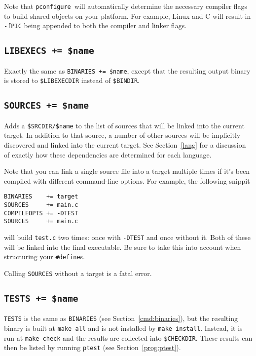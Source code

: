 \documentclass{article}
\newcommand{\pconfigure}{\texttt{pconfigure}}
\begin{document}
Note that \pconfigure\ will automatically determine the necessary
compiler flags to build shared objects on your platform.  For example,
Linux and C will result in \texttt{-fPIC} being appended to both the
compiler and linker flags.

\subsection{\texttt{LIBEXECS += \$name} \label{cmd:libexecs}}

Exactly the same as \texttt{BINARIES += \$name}, except that the
resulting output binary is stored to \texttt{\$LIBEXECDIR} instead of
\texttt{\$BINDIR}.

\subsection{\texttt{SOURCES += \$name} \label{cmd:sources}}

Adds a \texttt{\$SRCDIR/\$name} to the list of sources that will be
linked into the current target.  In addition to that source, a number
of other sources will be implicitly discovered and linked into the
current target.  See Section~\ref{lang} for a discussion of exactly
how these dependencies are determined for each language.

Note that you can link a single source file into a target multiple
times if it's been compiled with different command-line options.  For
example, the following snippit
\begin{verbatim}
BINARIES    += target
SOURCES     += main.c
COMPILEOPTS += -DTEST
SOURCES     += main.c
\end{verbatim}
will build \texttt{test.c} two times: once with \texttt{-DTEST} and
once without it.  Both of these will be linked into the final
executable.  Be sure to take this into account when structuring your
\texttt{\#define}s.

Calling \texttt{SOURCES} without a target is a fatal error.

\subsection{\texttt{TESTS += \$name}}

\texttt{TESTS} is the same as \texttt{BINARIES} (see
Section~\ref{cmd:binaries}), but the resulting binary is built at
\texttt{make all} and is not installed by \texttt{make install}.
Instead, it is run at \texttt{make check} and the results are
collected into \texttt{\$CHECKDIR}.  These results can then be listed
by running \texttt{ptest} (see Section~\ref{prog:ptest}).
\end{document}

